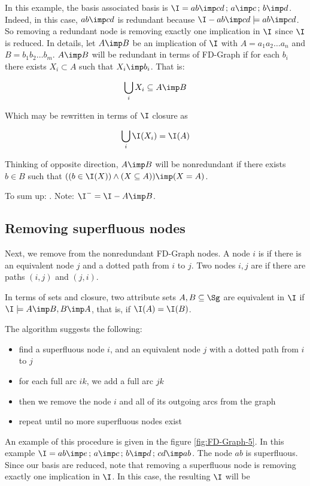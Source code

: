 

In this example, the basis associated basis is $\I = { ab \imp cd \, ; \, 
	a \imp c \, ; \, b \imp d}$. Indeed, in this case, $ab \imp cd$ is 
	redundant 
because $\I - {ab \imp cd} \models ab \imp cd$. So removing a redundant node is
removing exactly one implication in $\I$ since $\I$ is reduced. In details, let
$A \imp B$ be an implication of $\I$ with $A = a_1 a_2 \dots a_n$ and $B = b_1
b_2 \dots b_m$. $A \imp B$ will be redundant in terms of FD-Graph if for each 
$b_i$ there exists $X_i \subset A$ such that $X_i \imp b_i$. That is:

\[ \bigcup_i X_i \subseteq A \imp B \]

\noindent Which may be rewritten in terms of $\I$ closure as 

\[ \bigcup_i \I(X_i) = \I(A) \]

\noindent Thinking of opposite direction, $A \imp B$ will be nonredundant if
there exists $b \in B$ such that $((b \in \I(X)) \land (X \subseteq A)) \imp 
(X = A)$.

\vspace{1.2em}

\noindent To sum up: . Note:
$\I^{-} = \I - {A \imp B}$.  


\subsection{Removing superfluous nodes}

Next, we remove from the nonredundant FD-Graph  nodes. A 
node $i$ is  if there is an equivalent node $j$ and a 
dotted path from $i$ to $j$. Two nodes $i, j$ are  if there
are paths $(i, j)$ and $(j, i)$. 

\vspace{1.2em}

In terms of sets and closure, two attribute sets $A, B \subseteq \Sg$ are 
equivalent in $\I$ if $\I \models A \imp B, B \imp A$, that is, if $\I(A) = 
\I(B)$. 



\noindent The algorithm suggests the following:
\begin{itemize}
	\item find a superfluous node $i$, and an equivalent node $j$ with a dotted
	path from $i$ to $j$
	\item for each full arc $ik$, we add a full arc $jk$
	\item then we remove the node $i$ and all of its outgoing arcs from the 
	graph
	\item repeat until no more superfluous nodes exist
\end{itemize}
\noindent An example of this procedure is given in the figure
\ref{fig:FD-Graph-5}. In this example $\I = {ab \imp e \, ; \, a \imp c
	\, ; \, b \imp d \, ; \, cd \imp ab}$. The node $ab$ is superfluous. Since 
	our
basis are reduced, note that removing a superfluous node is removing exactly 
one implication in $\I$. In this case, the resulting $\I$ will be

